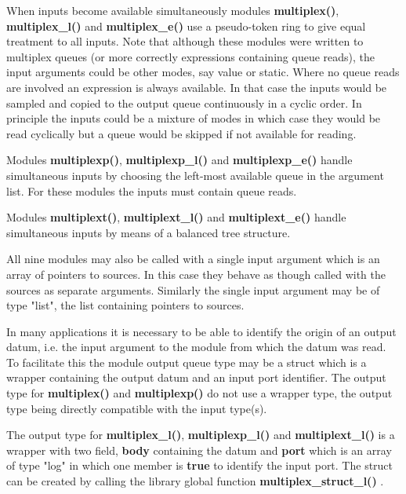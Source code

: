             When inputs become available simultaneously modules {\bf
            multiplex()}, {\bf multiplex\_l()} and {\bf multiplex\_e()} use a
            pseudo-token ring to give equal treatment to all inputs. Note that
            although these modules were written to multiplex queues (or more
            correctly expressions containing queue reads), the input arguments
            could be other modes, say value or static. Where no queue reads are
            involved an expression is always available. In that case the inputs
            would be sampled and copied to the output queue continuously in a
            cyclic order. In principle the inputs could be a mixture of modes in
            which case they would be read cyclically but a queue would be skipped
            if not available for reading.

            Modules {\bf multiplexp()}, {\bf multiplexp\_l()} and {\bf
            multiplexp\_e()} handle simultaneous inputs by choosing the
            left-most available queue in the argument list. For these modules the
            inputs must contain queue reads.

            Modules {\bf multiplext()}, {\bf multiplext\_l()} and {\bf
            multiplext\_e()} handle simultaneous inputs by means of a balanced tree
            structure.
            
            All nine modules may also be called with a single input argument
            which is an array of pointers to sources. In this case they behave
            as though called with the sources as separate arguments. Similarly
            the single input argument may be of type "list", the list containing
            pointers to sources.
            
            In many applications it is necessary to be able to identify the
            origin of an output datum, i.e. the input argument to the module
            from which the datum was read. To facilitate this the module output
            queue type may be a struct which is a wrapper containing the output
            datum and an input port identifier. The output type for {\bf
            multiplex()} and {\bf multiplexp()} do not use a wrapper type, the
            output type being directly compatible with the input type(s).
            
            The output type for {\bf multiplex\_l()}, {\bf multiplexp\_l()} and
            {\bf multiplext\_l()} is a wrapper with two field, {\bf body}
            containing the datum and {\bf port}  which is an array of type "log"
            in which one member is {\bf true} to identify the input port. The
            struct can be created by calling the library global function {\bf
            multiplex\_struct\_l()} .
            
